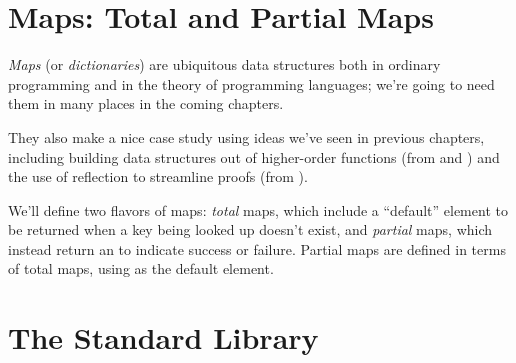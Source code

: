 \documentclass[12pt]{report}
\begin{document}

\begin{coqdoccode}
\end{coqdoccode}
\section{Maps: Total and Partial Maps}



 \textit{Maps} (or \textit{dictionaries}) are ubiquitous data structures both in
    ordinary programming and in the theory of programming languages;
    we're going to need them in many places in the coming chapters.


    They also make a nice case study using ideas we've seen in
    previous chapters, including building data structures out of
    higher-order functions (from  and ) and the use of
    reflection to streamline proofs (from ).


    We'll define two flavors of maps: \textit{total} maps, which include a
    ``default'' element to be returned when a key being looked up
    doesn't exist, and \textit{partial} maps, which instead return an
     to indicate success or failure.  Partial maps are defined
    in terms of total maps, using  as the default element. 
\begin{coqdoccode}
\coqdocemptyline
\end{coqdoccode}
\section{The  Standard Library}
\end{document}
